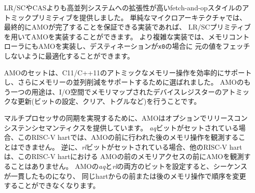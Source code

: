 \begin{commentary}
\begin{comment}
We provided fetch-and-op style atomic primitives as they scale to
highly parallel systems better than LR/SC or CAS.
A simple microarchitecture can implement AMOs using the LR/SC primitives,
provided the implementation can guarantee the AMO eventually completes.
More complex implementations might also implement AMOs at memory
controllers, and can optimize away fetching the original value when
the destination is {\tt x0}.
\end{comment}
LR/SCやCASよりも高並列システムへの拡張性が高いfetch-and-opスタイルのアトミックプリミティブを提供しました。
単純なマイクロアーキテクチャでは、最終的にAMOが完了することを保証できる実装であれば、
LR/SCプリミティブを用いてAMOを実装することができます。
より複雑な実装では、メモリコントローラにもAMOを実装し、デスティネーションが{\tt x0}の場合に
元の値をフェッチしないように最適化することができます。

\begin{comment}
The set of AMOs was chosen to support the C11/C++11 atomic memory
operations efficiently, and also to support parallel reductions in
memory.  Another use of AMOs is to provide atomic updates to
memory-mapped device registers (e.g., setting, clearing, or toggling
bits) in the I/O space.
\end{comment}

AMOのセットは、C11/C++11のアトミックなメモリー操作を効率的にサポートし、さらにメモリーの並列削減をサポートするために選ばれました。
AMOのもう一つの用途は、I/O空間でメモリマップされたデバイスレジスターのアトミックな更新(ビットの設定、クリア、トグルなど)を行うことです。
\end{commentary}

\begin{comment}
To help implement multiprocessor synchronization, the AMOs optionally
provide release consistency semantics.  If the {\em aq} bit is set,
then no later memory operations in this RISC-V hart can be observed
to take place before the AMO.
Conversely, if the {\em rl} bit is set, then other
RISC-V harts will not observe the AMO before memory accesses
preceding the AMO in this RISC-V hart.  Setting both the {\em aq} and the {\em
rl} bit on an AMO makes the sequence sequentially consistent, meaning that
it cannot be reordered with earlier or later memory operations from the same
hart.
\end{comment}

マルチプロセッサの同期を実現するために、AMOはオプションでリリースコンシステンシセマンティクスを提供しています。 
{\em aq}ビットがセットされている場合、このRISC-V hartでは、AMOの前に行われた後のメモリ操作を観測することはできません。
逆に、{\em rl}ビットがセットされている場合、他のRISC-V hartは、このRISC-V hartにおける
AMOの前のメモリアクセスの前にAMOを観測することはありません。
AMOの{\em aq}と{\em rl}の両方のビットを設定すると、シーケンスが一貫したものになり、
同じhartからの前または後のメモリ操作で順序を変更することができなくなります。


